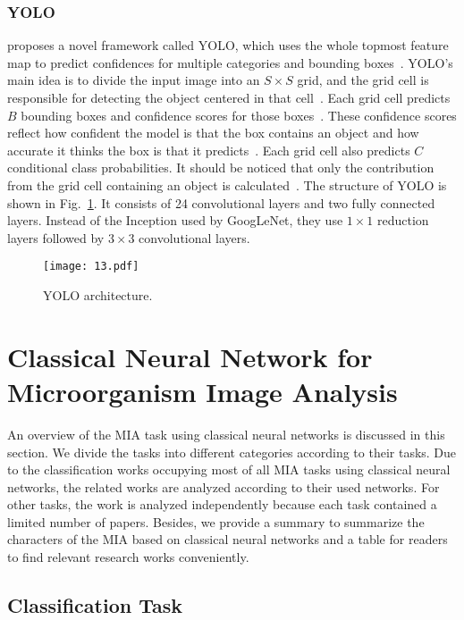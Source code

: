 \subsubsection{YOLO}
\cite{Redmon-2016-YOLO} proposes a novel framework called YOLO, which uses the whole topmost feature map to predict confidences for multiple categories and bounding boxes~\cite{Zhao-2019-ODDL}. YOLO's main idea is to divide the input image into an $ S \times S$ grid, and the grid cell is responsible for detecting the object centered in that cell~\cite{Redmon-2016-YOLO}. Each grid cell predicts $B$ bounding boxes and confidence scores for those boxes~\cite{Redmon-2016-YOLO}. These confidence scores reflect how confident the model is that the box contains an object and how accurate it thinks the box is that it predicts~\cite{Redmon-2016-YOLO}. Each grid cell also predicts $C$ conditional class probabilities. It should be noticed that only the contribution from the grid cell containing an object is calculated~\cite{Zhao-2019-ODDL}. The structure of YOLO is shown in Fig.~\ref{fig13}. It consists of 24 convolutional layers and two fully connected layers. Instead of the Inception used by GoogLeNet, they use $1\times 1$ reduction layers followed by $3\times3$ convolutional layers.

\begin{figure}[htbp!]
\centering
\texttt{[image: 13.pdf]}
\caption{YOLO architecture.}
\label{fig13}
\end{figure}

\section{Classical Neural Network for Microorganism Image Analysis}
\label{CNN}
An overview of the MIA task using classical neural networks is discussed in this section. We divide the tasks into different categories according to their tasks. Due to the classification works occupying most of all MIA tasks using classical neural networks, the related works are analyzed according to their used networks. For other tasks, the work is analyzed independently because each task contained a limited number of papers. Besides, we provide a summary to summarize the characters of the MIA based on classical neural networks and a table for readers to find relevant research works conveniently.


\subsection{Classification Task}



